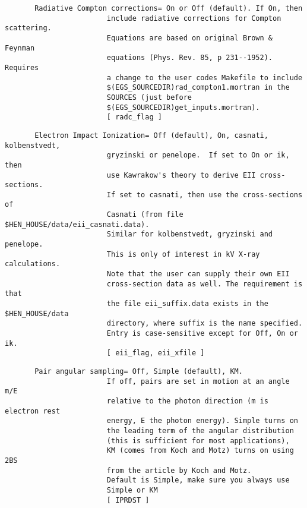 \begin{verbatim}
       Radiative Compton corrections= On or Off (default). If On, then
                        include radiative corrections for Compton scattering.
                        Equations are based on original Brown & Feynman
                        equations (Phys. Rev. 85, p 231--1952).  Requires
                        a change to the user codes Makefile to include
                        $(EGS_SOURCEDIR)rad_compton1.mortran in the
                        SOURCES (just before
                        $(EGS_SOURCEDIR)get_inputs.mortran).
                        [ radc_flag ]
\end{verbatim}
\begin{verbatim}
       Electron Impact Ionization= Off (default), On, casnati, kolbenstvedt,
                        gryzinski or penelope.  If set to On or ik, then
                        use Kawrakow's theory to derive EII cross-sections.
                        If set to casnati, then use the cross-sections of
                        Casnati (from file $HEN_HOUSE/data/eii_casnati.data).
                        Similar for kolbenstvedt, gryzinski and penelope.
                        This is only of interest in kV X-ray calculations.
                        Note that the user can supply their own EII
                        cross-section data as well. The requirement is that
                        the file eii_suffix.data exists in the $HEN_HOUSE/data
                        directory, where suffix is the name specified.
                        Entry is case-sensitive except for Off, On or ik.
                        [ eii_flag, eii_xfile ]
\end{verbatim}
\begin{verbatim}
       Pair angular sampling= Off, Simple (default), KM.
                        If off, pairs are set in motion at an angle m/E
                        relative to the photon direction (m is electron rest
                        energy, E the photon energy). Simple turns on
                        the leading term of the angular distribution
                        (this is sufficient for most applications),
                        KM (comes from Koch and Motz) turns on using 2BS
                        from the article by Koch and Motz.
                        Default is Simple, make sure you always use
                        Simple or KM
                        [ IPRDST ]
\end{verbatim}
